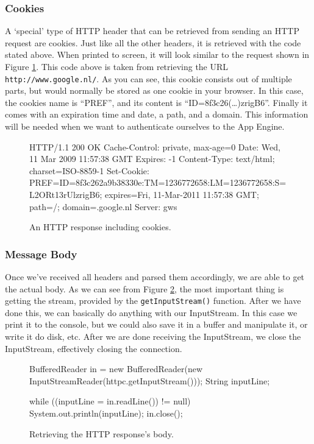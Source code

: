 \subsubsection{Cookies}
\label{clientimpl-cookies}
A `special' type of HTTP header that can be retrieved from sending an HTTP
request are cookies. Just like all the other headers, it is retrieved with the
code stated above. When printed to screen, it will look similar to the request
shown in Figure \ref{clientimpl-cookies-resp}. This code above is taken from
retrieving the URL \texttt{http://www.google.nl/}. As you can see, this cookie
consists out of multiple parts, but would normally be stored as one cookie in your
browser. In this case, the cookies name is ``PREF'', and its content is
``ID=8f3c26(\ldots)zrigB6''. Finally it comes with an expiration time and date,
a path, and a domain. This information will be needed when we want to authenticate
ourselves to the App Engine.

\begin{figure}[ht] %
\begin{center}
\begin{code}
HTTP/1.1 200 OK
Cache-Control: private, max-age=0
Date: Wed, 11 Mar 2009 11:57:38 GMT
Expires: -1
Content-Type: text/html; charset=ISO-8859-1
Set-Cookie: 
  PREF=ID=8f3c262a9b38330e:TM=1236772658:LM=1236772658:S=L2ORt13rUlzrigB6; 
  expires=Fri, 11-Mar-2011 11:57:38 GMT; path=/; domain=.google.nl
Server: gws
\end{code}
\caption{An HTTP response including cookies.\label{clientimpl-cookies-resp}}
\end{center}
\end{figure}

\subsubsection{Message Body}
Once we've received all headers and parsed them accordingly, we are able to get
the actual body. As we can see from Figure \ref{clientimpl-body}, the most
important thing is getting the stream, provided by the \texttt{getInputStream()}
function. After we have done this, we can basically do anything with our
InputStream. In this case we print it to the console, but we could also save it
in a buffer and manipulate it, or write it do disk, etc. After we are done
receiving the InputStream, we close the InputStream, effectively closing the
connection.

\begin{figure}[ht] %
\begin{center}
\begin{code}
BufferedReader in = 
  new BufferedReader(new InputStreamReader(httpc.getInputStream()));
String inputLine;

while ((inputLine = in.readLine()) != null) {
    System.out.println(inputLine);
}
in.close();
\end{code}
\caption{Retrieving the HTTP response's body.\label{clientimpl-body}}
\end{center}
\end{figure}

